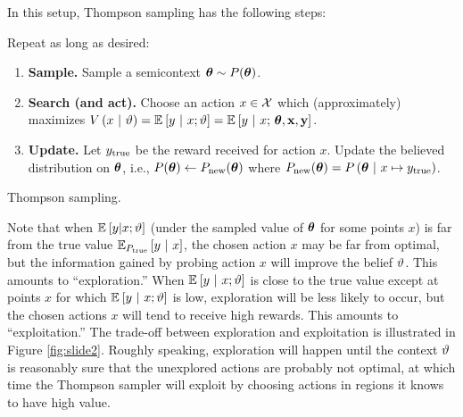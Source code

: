 In this setup, Thompson sampling has the following steps:
\begin{algorithm}[H]
  \singlespacing
  Repeat as long as desired:
  \begin{enumerate}
    \item\label{itm:thompson-step-sample} {\bf Sample.} Sample a semicontext
      $\thetabf \sim P(\thetabf)$.
    \item\label{itm:thompson-step-search} {\bf Search (and act).} Choose an
      action $x \in \Acal$ which (approximately) maximizes $V\pn{x \mvert
      \ttheta} = \Ebkt{y \mvert x; \ttheta} = \Ebkt{y \mvert x;\,\thetabf,
      \abf, \rbf}$.
    \item {\bf Update.} Let $y_\true$ be the reward received for action $x$.
      Update the believed distribution on $\thetabf$, i.e., $P(\thetabf) \gets
      P_\rmnew(\thetabf)$ where $P_\rmnew(\thetabf) = P\pn{\thetabf \mvert x \mapsto
      y_\true}$.
  \end{enumerate}
  \caption{Thompson sampling.}
  \label{alg:thompson}
\end{algorithm}
Note that when $\Ebkt{y|x;\ttheta}$ (under the sampled value of $\thetabf$ for
some points $x$) is far from the true value $\Ebkt[P_\true]{y \mvert x}$, the
chosen action $x$ may be far from optimal, but the information gained by probing
action $x$ will improve the belief $\ttheta$.  This amounts to ``exploration.''
When $\Ebkt{y \mvert x;\ttheta}$ is close to the true value except at points $x$
for which $\Ebkt{y \mvert x;\ttheta}$ is low, exploration will be less likely to
occur, but the chosen actions $x$ will tend to receive high rewards.  This
amounts to ``exploitation.'' The trade-off between exploration and exploitation
is illustrated in Figure \ref{fig:slide2}.  Roughly speaking, exploration will
happen until the context $\ttheta$ is reasonably sure that the unexplored
actions are probably not optimal, at which time the Thompson sampler will
exploit by choosing actions in regions it knows to have high value.

